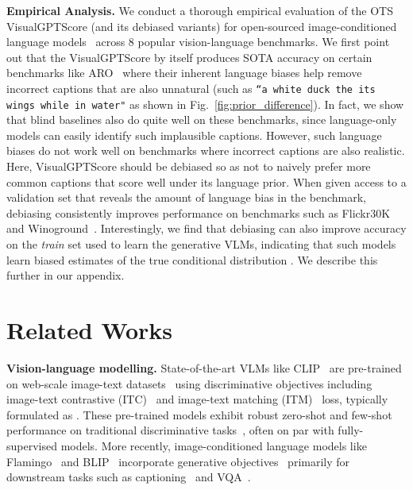 \documentclass{article} \usepackage{iclr2024_conference,times}
\begin{document}
{\bf Empirical Analysis.} We conduct a thorough empirical evaluation of the OTS VisualGPTScore (and its debiased variants) for open-sourced image-conditioned language models~\citep{blip, blip2} across 8 popular vision-language benchmarks. We first point out that the VisualGPTScore by itself produces SOTA accuracy on certain benchmarks like ARO~\citep{aro} where their inherent language biases help remove incorrect captions that are also unnatural (such as {\tt ``a white duck the its wings while in water"} as shown in Fig.~\ref{fig:prior_difference}). In fact, we show that blind baselines also do quite well on these benchmarks, since language-only models can easily identify such implausible captions. However, such language biases do not work well on benchmarks where incorrect captions are also realistic. Here, VisualGPTScore should be debiased so as not to naively prefer more common captions that score well under its language prior. When given access to a validation set that reveals the amount of language bias in the benchmark, debiasing consistently improves performance on benchmarks such as Flickr30K~\citep{flickr30k} and Winoground~\citep{winoground}. Interestingly, we find that debiasing can also improve accuracy on the {\em train} set used to learn the generative VLMs, indicating that such models learn biased estimates of the true conditional distribution . We describe this further in our appendix.



























\section{Related Works}


{\bf Vision-language modelling.} State-of-the-art VLMs like CLIP~\citep{clip} are pre-trained on web-scale image-text datasets~\citep{laion400m, laion5b} using discriminative objectives including image-text contrastive (ITC)~\citep{clip, align} and image-text matching (ITM)~\citep{albef, blip} loss, typically formulated as . These pre-trained models exhibit robust zero-shot and few-shot~\citep{lin2023multimodality, wortsman2022robust} performance on traditional discriminative tasks~\citep{deng2009imagenet, coco}, often on par with fully-supervised models. More recently, image-conditioned language models like Flamingo~\citep{flamingo} and BLIP~\citep{blip, blip2} incorporate generative objectives~\citep{bengio2003neural} primarily for downstream tasks such as captioning~\citep{nocaps} and VQA~\citep{vqa2}. 
\end{document}
